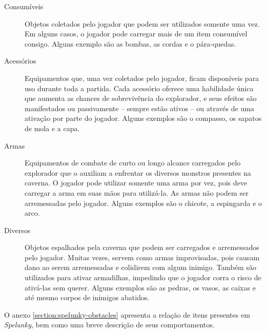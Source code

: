 \begin{description}
	\item[Consumíveis]
	Objetos coletados pelo jogador que podem ser utilizados somente uma vez. Em
	alguns casos, o jogador pode carregar mais de um item consumível consigo.
	Alguns exemplo são as bombas, as cordas e o pára-quedas.

	\item[Acessórios]
	Equipamentos que, uma vez coletados pelo jogador, ficam disponíveis para uso
	durante toda a partida. Cada acessório oferece uma habilidade única que
	aumenta as chances de sobrevivência do explorador, e seus efeitos são
	manifestados ou passivamente -- sempre estão ativos -- ou através de uma
	ativação por parte do jogador. Alguns exemplos são o compasso, os sapatos de
	mola e a capa.

	\item[Armas]
	Equipamentos de combate de curto ou longo alcance carregados pelo explorador
	que o auxiliam a enfrentar os diversos monstros presentes na caverna. O
	jogador pode utilizar somente uma arma por vez, pois deve carregar a arma em
	suas mãos para utilizá-la. As armas não podem ser arremessadas pelo jogador.
	Alguns exemplos são o chicote, a espingarda e o arco.

	\item[Diversos]
	Objetos espalhados pela caverna que podem ser carregados e arremessados pelo
	jogador. Muitas vezes, servem como armas improvisadas, pois causam dano ao
	serem arremessadas e colidirem com algum inimigo. Também são utilizados para
	ativar armadilhas, impedindo que o jogador corra o risco de ativá-las sem
	querer. Alguns exemplos são as pedras, os vasos, as caixas e até mesmo
	corpos de inimigos abatidos. 
\end{description}

O anexo \ref{section:spelunky-obstacles} apresenta a relação de itens presentes
em \textit{Spelunky}, bem como uma breve descrição de seus comportamentos.



